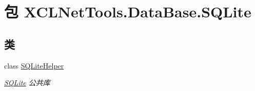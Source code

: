 \hypertarget{namespace_x_c_l_net_tools_1_1_data_base_1_1_s_q_lite}{\section{包 X\-C\-L\-Net\-Tools.\-Data\-Base.\-S\-Q\-Lite}
\label{namespace_x_c_l_net_tools_1_1_data_base_1_1_s_q_lite}
}
\subsection*{类}
\begin{DoxyCompactItemize}
\item 
class \hyperlink{class_x_c_l_net_tools_1_1_data_base_1_1_s_q_lite_1_1_s_q_lite_helper}{S\-Q\-Lite\-Helper}
\begin{DoxyCompactList}\small\item\em \hyperlink{namespace_x_c_l_net_tools_1_1_data_base_1_1_s_q_lite}{S\-Q\-Lite} 公共库 \end{DoxyCompactList}\end{DoxyCompactItemize}
